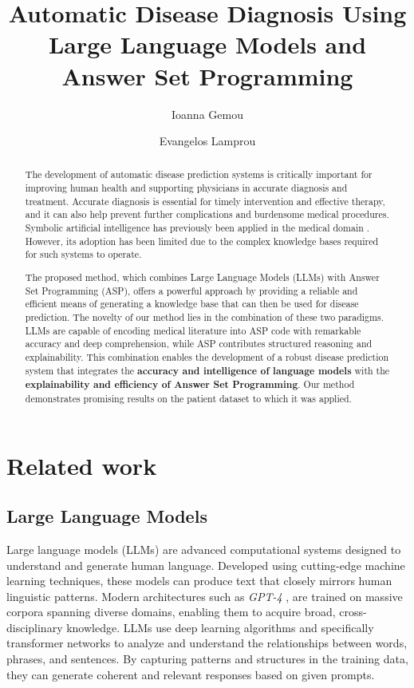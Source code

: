 \documentclass[10pt,leqno]{amsart}
\title{Automatic Disease Diagnosis Using Large Language Models and Answer Set Programming}
\author{
	Ioanna Gemou
	\and
	Evangelos Lamprou
}
\begin{document}
\maketitle
\begin{abstract}
The development of automatic disease prediction systems is critically important for improving human health and supporting physicians in accurate diagnosis and treatment. Accurate diagnosis is essential for timely intervention and effective therapy, and it can also help prevent further complications and burdensome medical procedures.
Symbolic artificial intelligence has previously been applied in the medical domain \cite{Alviano_2020}. However, its adoption has been limited due to the complex knowledge bases required for such systems to operate.

The proposed method, which combines Large Language Models (LLMs) with Answer Set Programming (ASP), offers a powerful approach by providing a reliable and efficient means of generating a knowledge base that can then be used for disease prediction.
The novelty of our method lies in the combination of these two paradigms. LLMs are capable of encoding medical literature into ASP code with remarkable accuracy and deep comprehension, while ASP contributes structured reasoning and explainability. This combination enables the development of a robust disease prediction system that integrates the \textbf{accuracy and intelligence of language models} with the \textbf{explainability and efficiency of Answer Set Programming}.
Our method demonstrates promising results on the patient dataset to which it was applied.
\end{abstract}

\section{Related work}

\subsection{Large Language Models}
Large language models (LLMs) \cite{zhao2023survey} are advanced computational systems 
designed to understand and generate human language. 
Developed using cutting-edge machine learning techniques, 
these models can produce text that closely mirrors human linguistic patterns.
Modern architectures such as \textit{GPT-4} \cite{openai2023gpt4}, 
are trained on massive corpora spanning diverse domains, 
enabling them to acquire broad, cross-disciplinary knowledge. 
LLMs use deep learning algorithms \cite{Sarker2021} 
and specifically transformer networks \cite{Dosovitskiy2020} 
to analyze and understand the relationships between words, phrases, and sentences. 
By capturing patterns and structures in the training data, 
they can generate coherent and relevant responses based on given prompts.
\end{document}
